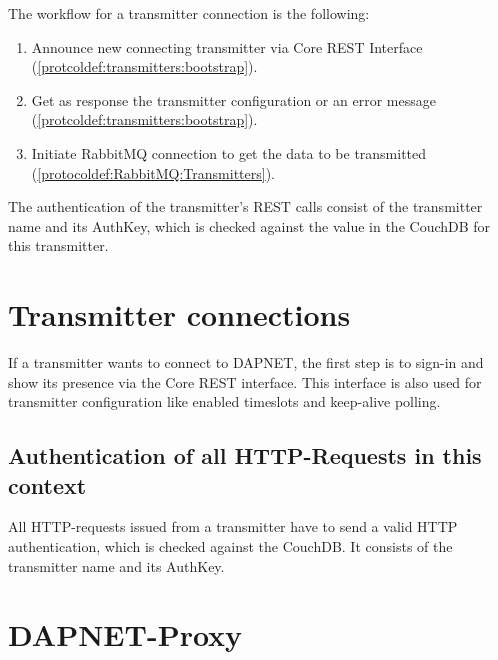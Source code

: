 The workflow for a transmitter connection is the following:
\begin{enumerate}
\item Announce new connecting transmitter via Core REST Interface (\ref{protcoldef:transmitters:bootstrap}).
\item Get as response the transmitter configuration or an error message (\ref{protcoldef:transmitters:bootstrap}).
\item Initiate RabbitMQ connection to get the data to be transmitted (\ref{protocoldef:RabbitMQ:Transmitters}).
\end{enumerate}

The authentication of the transmitter's REST calls consist of the transmitter
name and its AuthKey, which is checked against the value in the CouchDB for this
transmitter.

\section{Transmitter connections}
If a transmitter wants to connect to DAPNET, the first step is to sign-in and
show its presence via the Core REST interface. This interface is also used for
transmitter configuration like enabled timeslots and keep-alive polling.

\subsection{Authentication of all HTTP-Requests in this context}
All HTTP-requests issued from a transmitter have to send a valid HTTP
authentication, which is checked against the CouchDB. It consists of the
transmitter name and its AuthKey.


\section{DAPNET-Proxy}